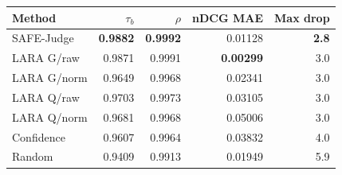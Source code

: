 \begin{tabular}{@{}lrrrr@{}}
\toprule
Method & $\tau_b$ & $\rho$ & nDCG MAE & Max drop \\
\midrule
SAFE-Judge & \textbf{0.9882} & \textbf{0.9992} & 0.01128 & \textbf{2.8} \\
LARA G/raw & 0.9871 & 0.9991 & \textbf{0.00299} & 3.0 \\
LARA G/norm & 0.9649 & 0.9968 & 0.02341 & 3.0 \\
LARA Q/raw & 0.9703 & 0.9973 & 0.03105 & 3.0 \\
LARA Q/norm & 0.9681 & 0.9968 & 0.05006 & 3.0 \\
Confidence & 0.9607 & 0.9964 & 0.03832 & 4.0 \\
Random & 0.9409 & 0.9913 & 0.01949 & 5.9 \\
\bottomrule
\end{tabular}
